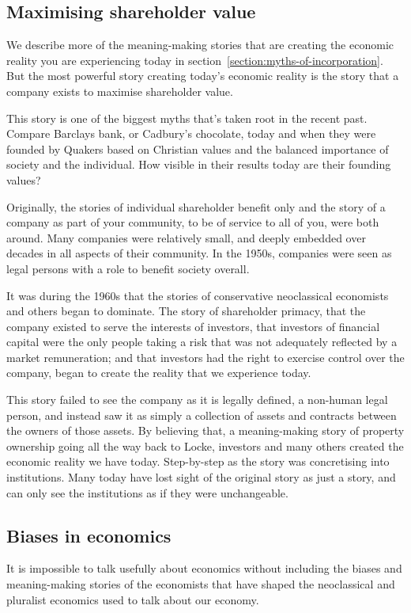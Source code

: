 \subsection{Maximising shareholder value}
We describe more of the meaning\hyp{}making stories that are creating the economic reality you are experiencing today in section~\ref{section:myths-of-incorporation}. But the most powerful story creating today's economic reality is the story that a company exists to maximise shareholder value\cite{veldman-modern-economics}.


This story is one of the biggest myths that's taken root in the recent past. Compare Barclays bank, or Cadbury's chocolate, today and when they were founded by Quakers based on Christian values and the balanced importance of society and the individual. How visible in their results today are their founding values?


Originally, the stories of individual shareholder benefit only and the story of a company as part of your community, to be of service to all of you, were both around. Many companies were relatively small, and deeply embedded over decades in all aspects of their community. In the 1950s, companies were seen as legal persons with a role to benefit society overall.


It was during the 1960s that the stories of conservative neoclassical economists and others began to dominate. The story of shareholder primacy, that the company existed to serve the interests of investors, that investors of financial capital were the only people taking a risk that was not adequately reflected by a market remuneration; and that investors had the right to exercise control over the company, began to create the reality that we experience today.


This story failed to see the company as it is legally defined, a non-human legal person, and instead saw it as simply a collection of assets and contracts between the owners of those assets. By believing that, a meaning\hyp{}making story of property ownership going all the way back to Locke, investors and many others created the economic reality we have today. Step-by-step as the story was concretising into institutions\cite{veldman-modern-economics, stout-shareholder}. Many today have lost sight of the original story as just a story, and can only see the institutions as if they were unchangeable.


\subsection{Biases in economics}
It is impossible to talk usefully about economics without including the biases and meaning\hyp{}making stories of the economists that have shaped the neoclassical and pluralist economics used to talk about our economy. 


